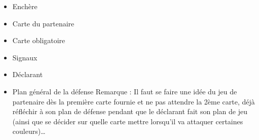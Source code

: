 \documentclass[a4paper]{article}
\begin{document}
\begin{itemize}
\item Enchère

\item Carte du partenaire

\item Carte obligatoire

\item Signaux

\item Déclarant

\item Plan général de la défense
Remarque : Il faut se faire une idée du jeu de partenaire dès la première carte fournie et ne pas attendre la 2ème carte, déjà réfléchir à son plan de défense pendant que le déclarant fait son plan de jeu (ainsi que se décider sur quelle carte mettre lorsqu’il va attaquer certaines couleurs)…


\end{itemize}
\end{document}

